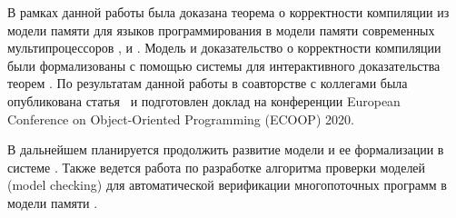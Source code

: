 \pagebreak


В рамках данной работы была доказана 
теорема о корректности компиляции из модели памяти 
для языков программирования \Wkm в модели памяти 
современных мультипроцессоров \Intel, \ARM и \POWER. 
Модель \Wkm и доказательство о корректности компиляции 
были формализованы с помощью системы для интерактивного 
доказательства теорем \coq. 
По результатам данной работы в соавторстве с коллегами 
была опубликована статья~\cite{Moiseenko-al:ECOOP20}
и подготовлен доклад на конференции 
European Conference on Object-Oriented Programming (ECOOP) 2020.

В дальнейшем планируется продолжить развитие 
модели \Wkm и ее формализации в системе \coq. 
Также ведется работа по разработке алгоритма 
проверки моделей (model checking) для 
автоматической верификации многопоточных программ 
в модели памяти \Wkm.  
